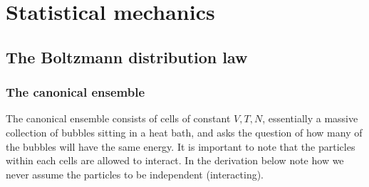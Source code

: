 \chapter{Statistical mechanics}
\section{The Boltzmann distribution law}
\subsection{The canonical ensemble}
The canonical ensemble consists of cells of constant $V,T,N$, essentially a massive collection of bubbles sitting in a heat bath, and asks the question of how many of the bubbles will have the same energy. It is important to note that the particles within each cells are allowed to interact. In the derivation below note how we never assume the particles to be independent (interacting).
